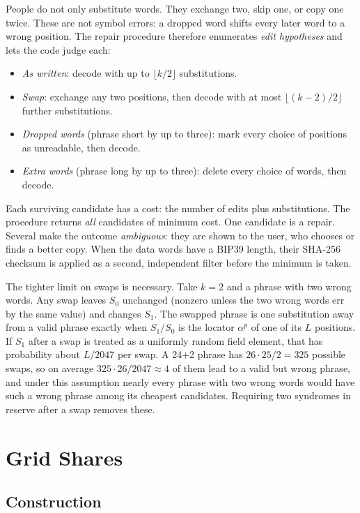 \documentclass[numeric]{anvil-paper}
\begin{document}
People do not only substitute words. They exchange two, skip one, or copy one
twice. These are not symbol errors: a dropped word shifts every later word to a
wrong position. The repair procedure therefore enumerates \emph{edit
hypotheses} and lets the code judge each:
\begin{itemize}
\item \emph{As written}: decode with up to $\lfloor k/2\rfloor$ substitutions.
\item \emph{Swap}: exchange any two positions, then decode with at most
  $\lfloor (k-2)/2\rfloor$ further substitutions.
\item \emph{Dropped words} (phrase short by up to three): mark every choice of
  positions as unreadable, then decode.
\item \emph{Extra words} (phrase long by up to three): delete every choice of
  words, then decode.
\end{itemize}
Each surviving candidate has a cost: the number of edits plus substitutions.
The procedure returns \emph{all} candidates of minimum cost. One candidate is a
repair. Several make the outcome \emph{ambiguous}: they are shown to the user,
who chooses or finds a better copy. When the data words have a BIP39 length,
their SHA-256 checksum is applied as a second, independent filter before the
minimum is taken.

The tighter limit on swaps is necessary. Take $k=2$ and a phrase with two
wrong words. Any swap leaves $S_0$ unchanged (nonzero unless the two wrong words err by
the same value) and changes $S_1$.
The swapped phrase is one substitution away from a valid phrase exactly when
$S_1/S_0$ is the locator $\alpha^p$ of one of its $L$ positions. If $S_1$ after
a swap is treated as a uniformly random field element, that has probability
about $L/2047$ per swap. A 24+2 phrase has $26\cdot25/2=325$ possible swaps,
so on average $325\cdot 26/2047\approx 4$ of them lead to a valid but wrong
phrase, and under this assumption nearly every phrase with two wrong words would
have such a wrong phrase among its cheapest candidates. Requiring two syndromes in reserve after a swap removes
these.

\section{Grid Shares}
\label{sec:grid}

\subsection{Construction}
\end{document}
